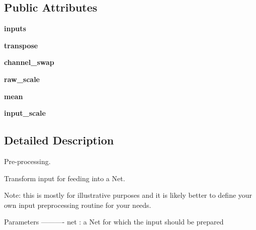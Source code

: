 \subsection*{Public Attributes}
\begin{DoxyCompactItemize}
\item 
\hypertarget{classcaffe_1_1io_1_1_transformer_a39504b59a20b17b063c896af4e0147a6}{}{\bfseries inputs}\label{classcaffe_1_1io_1_1_transformer_a39504b59a20b17b063c896af4e0147a6}

\item 
\hypertarget{classcaffe_1_1io_1_1_transformer_a0a2e0695edb3b47999ed4e9ae42771d4}{}{\bfseries transpose}\label{classcaffe_1_1io_1_1_transformer_a0a2e0695edb3b47999ed4e9ae42771d4}

\item 
\hypertarget{classcaffe_1_1io_1_1_transformer_aab33f13f4d564b0baddac568ff626e25}{}{\bfseries channel\+\_\+swap}\label{classcaffe_1_1io_1_1_transformer_aab33f13f4d564b0baddac568ff626e25}

\item 
\hypertarget{classcaffe_1_1io_1_1_transformer_a09f0e65ba030d5ded3dc5e3b229dd16f}{}{\bfseries raw\+\_\+scale}\label{classcaffe_1_1io_1_1_transformer_a09f0e65ba030d5ded3dc5e3b229dd16f}

\item 
\hypertarget{classcaffe_1_1io_1_1_transformer_a0a55c117f0577883e6d2c1251c01d16d}{}{\bfseries mean}\label{classcaffe_1_1io_1_1_transformer_a0a55c117f0577883e6d2c1251c01d16d}

\item 
\hypertarget{classcaffe_1_1io_1_1_transformer_a85c5851acbd0956a63742059b75df1c7}{}{\bfseries input\+\_\+scale}\label{classcaffe_1_1io_1_1_transformer_a85c5851acbd0956a63742059b75df1c7}

\end{DoxyCompactItemize}


\subsection{Detailed Description}
Pre-\/processing. 

\begin{DoxyVerb}Transform input for feeding into a Net.

Note: this is mostly for illustrative purposes and it is likely better
to define your own input preprocessing routine for your needs.

Parameters
----------
net : a Net for which the input should be prepared
\end{DoxyVerb}
 

